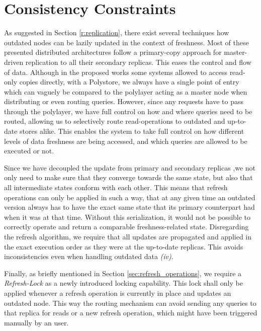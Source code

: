 

\section{Consistency Constraints}
\label{sec:consistency_concept}

As suggested in Section \ref{r:replication}, there exist several techniques how outdated nodes can be lazily updated in the context of freshness.
Most of these presented distributed architectures follow a primary-copy approach for master-driven replication to all their secondary replicas.
This eases the control and flow of data. Although in the proposed works some systems allowed to access read-only copies directly,
with a Polystore, we always have a single point of entry which can vaguely be compared to the polylayer acting as a master node
when distributing or even routing queries. However, since any requests have to pass through the polylayer,
we have full control on how and where queries need to be routed, allowing us to selectively route read-operations to outdated and up-to-date stores alike.
This enables the system to take full control on how different levels of data freshness are being accessed, and which queries are allowed to be executed or not.

Since we have decoupled the update from primary and secondary replicas ,we not only need to make sure that they converge towards the same state, but also that 
all intermediate states conform with each other. This means that refresh operations can only be applied in such a way, that at any given time an outdated version always has
to have the exact same state that its primary counterpart had when it was at that time. Without this serialization, it would not be possible to correctly operate and return 
a comparable freshness-related state. 
Disregarding the refresh algorithm, we require that all updates are propagated and applied in the exact execution order as they were at the up-to-date 
replicas. This avoids inconsistencies even when handling outdated data \textit{(iv)}.

Finally, as briefly mentioned in Section \ref{sec:refresh_operations}, we require a \emph{Refresh-Lock} as a newly introduced locking capability.
This lock shall only be applied whenever a refresh operation is currently in place and updates an outdated node. 
This way the routing mechanism can avoid sending any queries to that replica for reads or a new refresh operation, which might have been triggered manually by an user.



